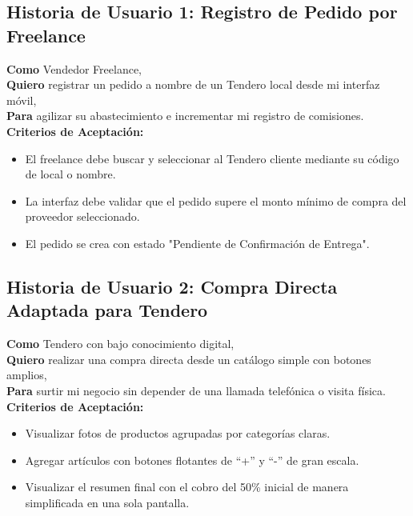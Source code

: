 \documentclass[12pt,spanish,a4paper]{report}
\begin{document}
\subsection*{Historia de Usuario 1: Registro de Pedido por Freelance}
\textbf{Como} Vendedor Freelance,\\
\textbf{Quiero} registrar un pedido a nombre de un Tendero local desde mi interfaz móvil,\\
\textbf{Para} agilizar su abastecimiento e incrementar mi registro de comisiones.\\
\textbf{Criterios de Aceptación:}
\begin{itemize}
    \item El freelance debe buscar y seleccionar al Tendero cliente mediante su código de local o nombre.
    \item La interfaz debe validar que el pedido supere el monto mínimo de compra del proveedor seleccionado.
    \item El pedido se crea con estado "Pendiente de Confirmación de Entrega".
\end{itemize}

\subsection*{Historia de Usuario 2: Compra Directa Adaptada para Tendero}
\textbf{Como} Tendero con bajo conocimiento digital,\\
\textbf{Quiero} realizar una compra directa desde un catálogo simple con botones amplios,\\
\textbf{Para} surtir mi negocio sin depender de una llamada telefónica o visita física.\\
\textbf{Criterios de Aceptación:}
\begin{itemize}
    \item Visualizar fotos de productos agrupadas por categorías claras.
    \item Agregar artículos con botones flotantes de ``+'' y ``-'' de gran escala.
    \item Visualizar el resumen final con el cobro del 50\% inicial de manera simplificada en una sola pantalla.
\end{itemize}
\end{document}

